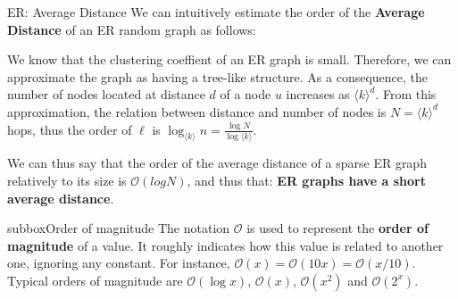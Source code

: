 \documentclass[a4paper,11pt]{book}
\begin{document}
\begin{textbox}{ER: Average Distance}
We can intuitively estimate the order of the \textbf{Average Distance} of an ER random graph as follows: 

We know that the clustering coeffient of an ER graph is small. Therefore, we can approximate the graph as having a tree-like structure. As a consequence, the number of nodes located at distance $d$ of a node $u$ increases as $\langle k \rangle^d$. From this approximation, the relation between distance and number of nodes is $N=\langle k \rangle^d$ hops, thus the order of $\ell$ is  $\log_{\langle k \rangle}n=\frac{\log N}{\log \langle k \rangle}$.

We can thus say that the order of the average distance of a sparse ER graph relatively to its size is $\mathcal{O}(log N)$, and thus that: \textbf{ER graphs have a short average distance}.



\end{textbox}


\begin{subbox}{subbox}{Order of magnitude}
 The notation $\mathcal{O}$ is used to represent the \textbf{order of magnitude} of a value. It roughly indicates how this value is related to another one, ignoring any constant. For instance, $\mathcal{O}(x)=\mathcal{O}(10x)=\mathcal{O}(x/10)$. Typical orders of magnitude are $\mathcal{O}(\log x)$, $\mathcal{O}( x)$, $\mathcal{O}(x^2)$ and $\mathcal{O}(2^x)$.
\end{subbox}
\end{document}
